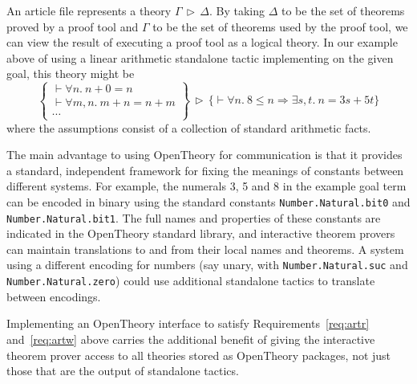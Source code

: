 \documentclass{llncs}
\newcommand{\OpenTheory}{OpenTheory\xspace}
\newcommand{\theory}[2]{{#1}\,\triangleright\,{#2}}
\begin{document}
An article file represents a theory $\theory{\Gamma}{\Delta}$.
By taking $\Delta$ to be the set of theorems proved by a proof tool and $\Gamma$ to be the set of theorems used by the proof tool, we can view the result of executing a proof tool as a logical theory.
In our example above of using a linear arithmetic standalone tactic implementing on the given goal, this theory might be
\[
\theory{\left\{\begin{array}{l}
\vdash\forall n.\ n + 0 = n \\
\vdash\forall m,n.\ m + n = n + m \\
\cdots
\end{array}\right\}}
{\bigl\{\vdash\forall n.\ 8\le n\Rightarrow\exists s,t.\ n = 3s + 5t\bigr\}}
\]
where the assumptions consist of a collection of standard arithmetic facts.


The main advantage to using \OpenTheory for communication is that it provides a standard, independent framework for fixing the meanings of constants between different systems.
For example, the numerals 3, 5 and 8 in the example goal term can be encoded in binary using the standard constants \texttt{Number.Natural.bit0} and \texttt{Number.Natural.bit1}.
The full names and properties of these constants are indicated in the \OpenTheory standard library, and interactive theorem provers can maintain translations to and from their local names and theorems.
A system using a different encoding for numbers (say unary, with \texttt{Number.Natural.suc} and \texttt{Number.Natural.zero}) could use additional standalone tactics to translate between encodings.

Implementing an \OpenTheory interface to satisfy Requirements~\ref{req:artr} and~\ref{req:artw} above carries the additional benefit of giving the interactive theorem prover access to all theories stored as \OpenTheory packages, not just those that are the output of standalone tactics.
\end{document}

